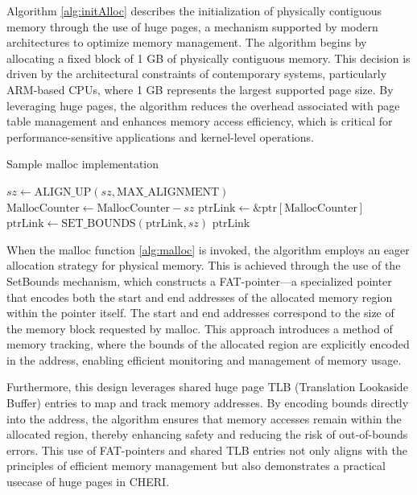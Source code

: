\documentclass[11pt]{article}
\begin{document}
Algorithm \ref{alg:initAlloc} describes the initialization of physically contiguous memory through the use of huge pages,
a mechanism supported by modern architectures to optimize memory management. The algorithm begins by 
allocating a fixed block of 1 GB of physically contiguous memory. This decision is driven by the 
architectural constraints of contemporary systems, particularly ARM-based CPUs, where 1 GB represents 
the largest supported page size. By leveraging huge pages, the algorithm reduces the overhead associated 
with page table management and enhances memory access efficiency, which is critical for performance-sensitive
applications and kernel-level operations.

\begin{algorithm}
\caption{Sample malloc implementation}
\label{alg:malloc}
\begin{algorithmic}[1]
    \State $sz \gets \text{ALIGN\_UP}(sz, \text{MAX\_ALIGNMENT})$ 
    \State $\text{MallocCounter} \gets \text{MallocCounter} - sz$ 
    \State $\text{ptrLink} \gets \&\text{ptr}[\text{MallocCounter}]$ 
    \State $\text{ptrLink} \gets \text{SET\_BOUNDS}(\text{ptrLink}, sz)$ 
    \State \Return $\text{ptrLink}$ 
\EndFunction
\end{algorithmic}
\end{algorithm}
When the malloc function \ref{alg:malloc} is invoked, the algorithm employs an eager allocation strategy for physical memory. 
This is achieved through the use of the SetBounds mechanism, which constructs a FAT-pointer—a specialized 
pointer that encodes both the start and end addresses of the allocated memory region within the pointer 
itself. The start and end addresses correspond to the size of the memory block requested by malloc. This 
approach introduces a method of memory tracking, where the bounds of the allocated region are 
explicitly encoded in the address, enabling efficient monitoring and management of memory usage.

Furthermore, this design leverages shared huge page TLB (Translation Lookaside Buffer) entries to map 
and track memory addresses. By encoding bounds directly into the address, the algorithm ensures that memory 
accesses remain within the allocated region, thereby enhancing safety and reducing the risk of out-of-bounds 
errors. This use of FAT-pointers and shared TLB entries not only aligns with the principles of 
efficient memory management but also demonstrates a practical usecase of huge pages in CHERI.
\end{document}
